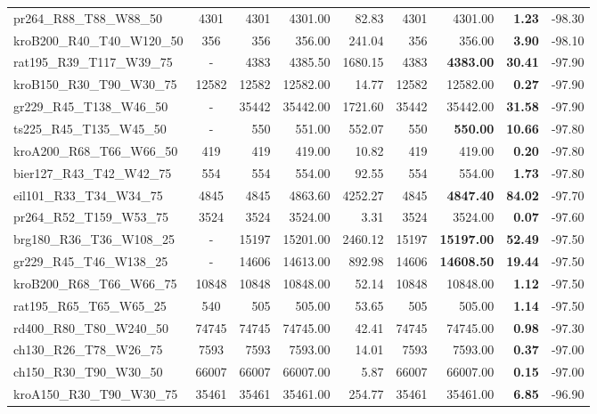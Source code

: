 \documentclass{ro}
\begin{document}
\begin{table}[!ht]
{\begin{tabular}{lcrrrrrrr}
pr264\_R88\_T88\_W88\_50 & 4301 & 4301 & 4301.00 & 82.83 & 4301 & 4301.00 & \textbf{1.23} & -98.30 \\
kroB200\_R40\_T40\_W120\_50 & 356 & 356 & 356.00 & 241.04 & 356 & 356.00 & \textbf{3.90} & -98.10 \\
rat195\_R39\_T117\_W39\_75 & - & 4383 & 4385.50 & 1680.15 & 4383 & \textbf{4383.00} & \textbf{30.41} & -97.90 \\
kroB150\_R30\_T90\_W30\_75 & 12582 & 12582 & 12582.00 & 14.77 & 12582 & 12582.00 & \textbf{0.27} & -97.90 \\
gr229\_R45\_T138\_W46\_50 & - & 35442 & 35442.00 & 1721.60 & 35442 & 35442.00 & \textbf{31.58} & -97.90 \\
ts225\_R45\_T135\_W45\_50 & - & 550 & 551.00 & 552.07 & 550 & \textbf{550.00} & \textbf{10.66} & -97.80 \\
kroA200\_R68\_T66\_W66\_50 & 419 & 419 & 419.00 & 10.82 & 419 & 419.00 & \textbf{0.20} & -97.80 \\
bier127\_R43\_T42\_W42\_75 & 554 & 554 & 554.00 & 92.55 & 554 & 554.00 & \textbf{1.73} & -97.80 \\
eil101\_R33\_T34\_W34\_75 & 4845 & 4845 & 4863.60 & 4252.27 & 4845 & \textbf{4847.40} & \textbf{84.02} & -97.70 \\
pr264\_R52\_T159\_W53\_75 & 3524 & 3524 & 3524.00 & 3.31 & 3524 & 3524.00 & \textbf{0.07} & -97.60 \\
brg180\_R36\_T36\_W108\_25 & - & 15197 & 15201.00 & 2460.12 & 15197 & \textbf{15197.00} & \textbf{52.49} & -97.50 \\
gr229\_R45\_T46\_W138\_25 & - & 14606 & 14613.00 & 892.98 & 14606 & \textbf{14608.50} & \textbf{19.44} & -97.50 \\
kroB200\_R68\_T66\_W66\_75 & 10848 & 10848 & 10848.00 & 52.14 & 10848 & 10848.00 & \textbf{1.12} & -97.50 \\
rat195\_R65\_T65\_W65\_25 & 540 & 505 & 505.00 & 53.65 & 505 & 505.00 & \textbf{1.14} & -97.50 \\
rd400\_R80\_T80\_W240\_50 & 74745 & 74745 & 74745.00 & 42.41 & 74745 & 74745.00 & \textbf{0.98} & -97.30 \\
ch130\_R26\_T78\_W26\_75 & 7593 & 7593 & 7593.00 & 14.01 & 7593 & 7593.00 & \textbf{0.37} & -97.00 \\
ch150\_R30\_T90\_W30\_50 & 66007 & 66007 & 66007.00 & 5.87 & 66007 & 66007.00 & \textbf{0.15} & -97.00 \\
kroA150\_R30\_T90\_W30\_75 & 35461 & 35461 & 35461.00 & 254.77 & 35461 & 35461.00 & \textbf{6.85} & -96.90 \\

\end{tabular}}
\end{table}
\end{document}
